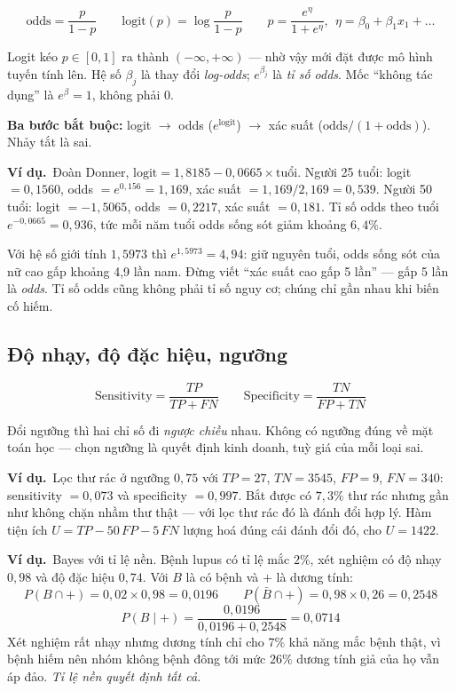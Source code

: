 \documentclass[11pt]{article}
\newcommand{\vd}{\textbf{Ví dụ.}\ }
\begin{document}
\[
\text{odds} = \frac{p}{1-p}
\qquad
\text{logit}(p) = \log\frac{p}{1-p}
\qquad
p = \frac{e^{\eta}}{1+e^{\eta}},\ \ \eta = \beta_0 + \beta_1 x_1 + \dots
\]

Logit kéo $p \in [0,1]$ ra thành $(-\infty,+\infty)$ --- nhờ vậy mới đặt được mô
hình tuyến tính lên. Hệ số $\beta_j$ là thay đổi \emph{log-odds}; $e^{\beta_j}$ là
\emph{tỉ số odds}. Mốc ``không tác dụng'' là $e^{\beta}=1$, không phải 0.

\textbf{Ba bước bắt buộc:} logit $\to$ odds ($e^{\text{logit}}$) $\to$ xác suất
($\text{odds}/(1+\text{odds})$). Nhảy tắt là sai.

\vd Đoàn Donner, $\text{logit} = 1{,}8185 - 0{,}0665 \times \text{tuổi}$.
Người 25 tuổi: logit $= 0{,}1560$, odds $= e^{0{,}156} = 1{,}169$, xác suất
$= 1{,}169/2{,}169 = 0{,}539$. Người 50 tuổi: logit $= -1{,}5065$, odds $=0{,}2217$,
xác suất $= 0{,}181$. Tỉ số odds theo tuổi $e^{-0{,}0665} = 0{,}936$, tức mỗi năm
tuổi odds sống sót giảm khoảng $6{,}4\%$.

Với hệ số giới tính $1{,}5973$ thì $e^{1{,}5973} = 4{,}94$: giữ nguyên tuổi, odds
sống sót của nữ cao gấp khoảng 4,9 lần nam. Đừng viết ``xác suất cao gấp 5 lần'' ---
gấp 5 lần là \emph{odds}. Tỉ số odds cũng không phải tỉ số nguy cơ; chúng chỉ gần
nhau khi biến cố hiếm.

\subsection*{Độ nhạy, độ đặc hiệu, ngưỡng}

\[
\text{Sensitivity} = \frac{TP}{TP+FN}
\qquad
\text{Specificity} = \frac{TN}{FP+TN}
\]

Đổi ngưỡng thì hai chỉ số đi \emph{ngược chiều} nhau. Không có ngưỡng đúng về mặt
toán học --- chọn ngưỡng là quyết định kinh doanh, tuỳ giá của mỗi loại sai.

\vd Lọc thư rác ở ngưỡng $0{,}75$ với $TP=27$, $TN=3545$, $FP=9$, $FN=340$:
sensitivity $= 0{,}073$ và specificity $= 0{,}997$. Bắt được có $7{,}3\%$ thư rác
nhưng gần như không chặn nhầm thư thật --- với lọc thư rác đó là đánh đổi hợp lý.
Hàm tiện ích $U = TP - 50\,FP - 5\,FN$ lượng hoá đúng cái đánh đổi đó, cho
$U = 1422$.

\vd Bayes với tỉ lệ nền. Bệnh lupus có tỉ lệ mắc $2\%$, xét nghiệm có độ nhạy
$0{,}98$ và độ đặc hiệu $0{,}74$. Với $B$ là có bệnh và $+$ là dương tính:
\[
P(B \cap +) = 0{,}02 \times 0{,}98 = 0{,}0196
\qquad
P(\bar B \cap +) = 0{,}98 \times 0{,}26 = 0{,}2548
\]
\[
P(B \mid +) = \frac{0{,}0196}{0{,}0196+0{,}2548} = 0{,}0714
\]
Xét nghiệm rất nhạy nhưng dương tính chỉ cho $7\%$ khả năng mắc bệnh thật, vì bệnh
hiếm nên nhóm không bệnh đông tới mức $26\%$ dương tính giả của họ vẫn áp đảo.
\emph{Tỉ lệ nền quyết định tất cả.}
\end{document}
